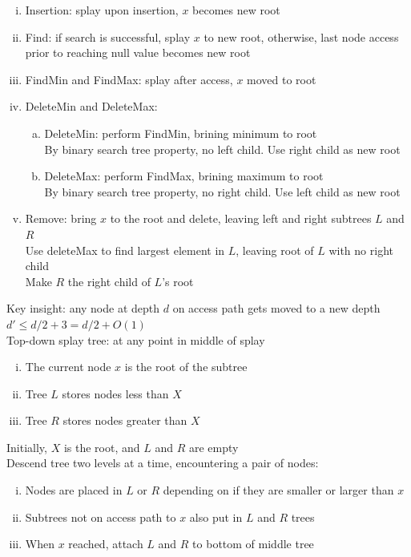 \documentclass{article}
\begin{document}
			\begin{enumerate}[(i)]
				\item Insertion: splay upon insertion, $x$ becomes new root
				\item Find: if search is successful, splay $x$ to new root, otherwise, last node access prior to reaching null value becomes new root
				\item FindMin and FindMax: splay after access, $x$ moved to root
				\item DeleteMin and DeleteMax:
				\begin{enumerate}[(a)]
					\item DeleteMin: perform FindMin, brining minimum to root \\
					By binary search tree property, no left child. Use right child as new root
					\item DeleteMax: perform FindMax, brining maximum to root \\
					By binary search tree property, no right child. Use left child as new root
					\end{enumerate}
				\item Remove: bring $x$ to the root and delete, leaving left and right subtrees $L$ and $R$ \\
				Use deleteMax to find largest element in $L$, leaving root of $L$ with no right child \\
				Make $R$ the right child of $L$'s root
				\end{enumerate}
			Key insight: any node at depth $d$ on access path gets moved to a new depth $d' \leq d/2 + 3 = d/2 + O(1)$ \\
			Top-down splay tree: at any point in middle of splay
			\begin{enumerate}[(i)]
				\item The current node $x$ is the root of the subtree
				\item Tree $L$ stores nodes less than $X$
				\item Tree $R$ stores nodes greater than $X$
				\end{enumerate}
			Initially, $X$ is the root, and $L$ and $R$ are empty \\
			Descend tree two levels at a time, encountering a pair of nodes: \\
			\begin{enumerate}[(i)]
				\item Nodes are placed in $L$ or $R$ depending on if they are smaller or larger than $x$
				\item Subtrees not on access path to $x$ also put in $L$ and $R$ trees
				\item When $x$ reached, attach $L$ and $R$ to bottom of middle tree
				\end{enumerate}
		\clearpage
	
\end{document}
